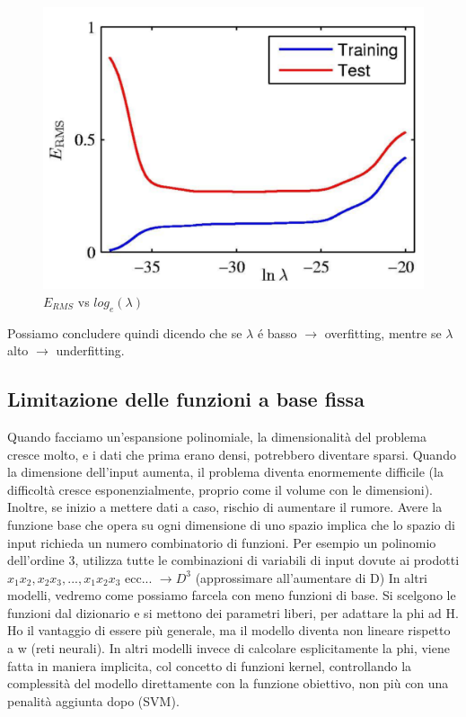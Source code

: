 \documentclass{article}
\begin{document}
\begin{figure}[H]
\centering
\includegraphics[scale=0.3]{Images/Ermsvslambda.png}
\caption{$E_{RMS}$ vs $log_e(\lambda)$}
\end{figure}

Possiamo concludere quindi dicendo che se $\lambda$ é basso $\rightarrow$ overfitting, mentre se $\lambda$ alto $\rightarrow$ underfitting.

\subsection{Limitazione delle funzioni a base fissa}
Quando facciamo un'espansione polinomiale, la dimensionalità del problema cresce molto, e i dati che prima erano densi, potrebbero diventare sparsi. Quando la dimensione dell'input aumenta, il problema diventa enormemente difficile (la difficoltà cresce esponenzialmente, proprio come il volume con le dimensioni). Inoltre, se inizio a mettere dati a caso, rischio di aumentare il rumore. Avere la funzione base che opera su ogni dimensione di uno spazio implica che lo spazio di input richieda un numero combinatorio di funzioni. Per esempio un polinomio dell'ordine 3, utilizza tutte le combinazioni di variabili di input dovute ai prodotti $x_1x_2, x_2x_3, ..., x_1x_2x_3 \text{ ecc... }\rightarrow D^3$ (approssimare all'aumentare di D) \newline
In altri modelli, vedremo come possiamo farcela con meno funzioni di base. Si scelgono le funzioni dal dizionario e si mettono dei parametri liberi, per adattare la phi ad H.
Ho il vantaggio di essere più generale, ma il modello diventa non lineare rispetto a w (reti neurali). \newline 
In altri modelli invece di calcolare esplicitamente la phi, viene fatta in maniera implicita, col concetto di funzioni kernel, controllando la complessità del modello direttamente con la funzione obiettivo, non più con una penalità aggiunta dopo (SVM).
\end{document}
